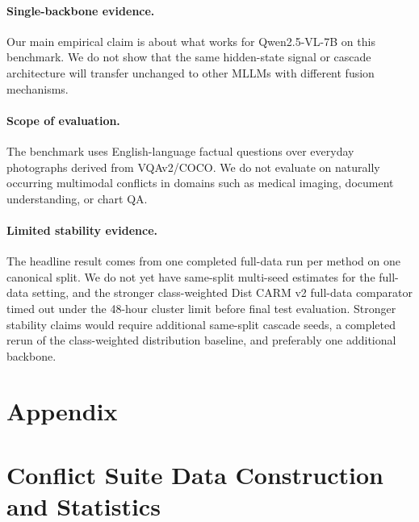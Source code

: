 \documentclass[11pt]{article}
\begin{document}
\paragraph{Single-backbone evidence.}
Our main empirical claim is about what works for Qwen2.5-VL-7B on this benchmark. We do
not show that the same hidden-state signal or cascade architecture will transfer unchanged
to other MLLMs with different fusion mechanisms.

\paragraph{Scope of evaluation.}
The benchmark uses English-language factual questions over everyday photographs derived from
VQAv2/COCO. We do not evaluate on naturally occurring multimodal conflicts in domains such
as medical imaging, document understanding, or chart QA.

\paragraph{Limited stability evidence.}
The headline result comes from one completed full-data run per method on one canonical
split. We do not yet have same-split multi-seed estimates for the full-data setting, and
the stronger class-weighted Dist CARM v2 full-data comparator timed out under the 48-hour
cluster limit before final test evaluation. Stronger stability claims would require
additional same-split cascade seeds, a completed rerun of the class-weighted distribution
baseline, and preferably one additional backbone.




\clearpage
\onecolumn
\appendix
\setcounter{table}{0}
\makeatletter
{}
\renewcommand{\thetable}{\thesection\arabic{table}}
\makeatother
\section*{Appendix}

\section{Conflict Suite Data Construction and Statistics}
\label{app:dataset}
\end{document}
